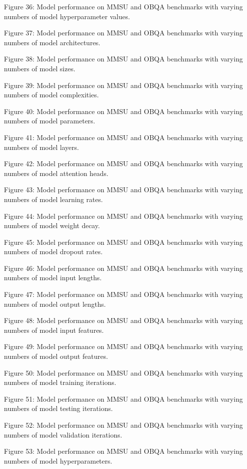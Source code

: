         Figure 36: Model performance on MMSU and OBQA benchmarks with varying numbers of model hyperparameter values.

        Figure 37: Model performance on MMSU and OBQA benchmarks with varying numbers of model architectures.

        Figure 38: Model performance on MMSU and OBQA benchmarks with varying numbers of model sizes.

        Figure 39: Model performance on MMSU and OBQA benchmarks with varying numbers of model complexities.

        Figure 40: Model performance on MMSU and OBQA benchmarks with varying numbers of model parameters.

        Figure 41: Model performance on MMSU and OBQA benchmarks with varying numbers of model layers.

        Figure 42: Model performance on MMSU and OBQA benchmarks with varying numbers of model attention heads.

        Figure 43: Model performance on MMSU and OBQA benchmarks with varying numbers of model learning rates.

        Figure 44: Model performance on MMSU and OBQA benchmarks with varying numbers of model weight decay.

        Figure 45: Model performance on MMSU and OBQA benchmarks with varying numbers of model dropout rates.

        Figure 46: Model performance on MMSU and OBQA benchmarks with varying numbers of model input lengths.

        Figure 47: Model performance on MMSU and OBQA benchmarks with varying numbers of model output lengths.

        Figure 48: Model performance on MMSU and OBQA benchmarks with varying numbers of model input features.

        Figure 49: Model performance on MMSU and OBQA benchmarks with varying numbers of model output features.

        Figure 50: Model performance on MMSU and OBQA benchmarks with varying numbers of model training iterations.

        Figure 51: Model performance on MMSU and OBQA benchmarks with varying numbers of model testing iterations.

        Figure 52: Model performance on MMSU and OBQA benchmarks with varying numbers of model validation iterations.

        Figure 53: Model performance on MMSU and OBQA benchmarks with varying numbers of model hyperparameters.

